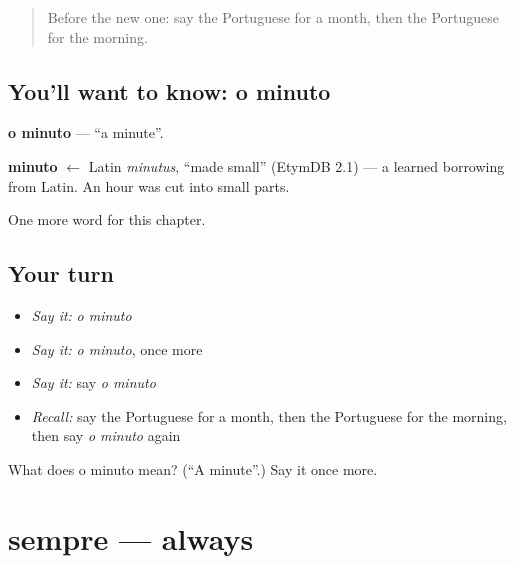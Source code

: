 \label{lesson:PT-C70-minuto}



\begin{quote}
Before the new one: say the Portuguese for a month, then the Portuguese for the morning.
\end{quote}

\subsection*{You'll want to know: o minuto}
\textbf{o minuto} — \textquotedblleft{}a minute\textquotedblright{}.

\begin{cousinweb}
\textbf{minuto} $\leftarrow$ Latin \emph{minutus}, \textquotedblleft{}made small\textquotedblright{} (EtymDB 2.1) — a learned borrowing from Latin. An hour was cut into small parts.
\end{cousinweb}

\begin{grammarlens}[title={What you've built}]
One more word for this chapter.
\end{grammarlens}

\subsection*{Your turn}
\begin{itemize}
\raggedright
  \item \emph{Say it:} \emph{o minuto}
  \item \emph{Say it:} \emph{o minuto}, once more
  \item \emph{Say it:} say \emph{o minuto}
  \item \emph{Recall:} say the Portuguese for a month, then the Portuguese for the morning, then say \emph{o minuto} again
\end{itemize}

\begin{tcolorbox}[breakable,colback=teal!4,colframe=teal!35!black,title={Before you move on}]
What does o minuto mean? (\textquotedblleft{}A minute\textquotedblright{}.) Say it once more.
\end{tcolorbox}
\section[sempre]{sempre — always}

\label{lesson:PT-C70-sempre}



